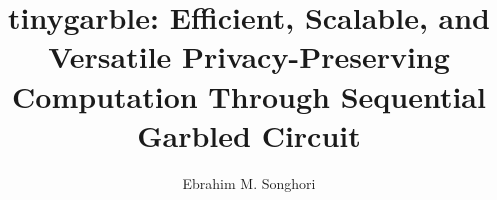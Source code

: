 \documentclass[12pt]{ruthesis}
\title{\gls{tinygarble}: Efficient, Scalable, and Versatile Privacy-Preserving Computation Through Sequential Garbled Circuit}
\author{Ebrahim M. Songhori}
\begin{document}
  \begin{frontmatter}
   \maketitle
   
   \tableofcontents
   \listoffigures
   \listoftables
  \end{frontmatter}











\appendices





\pagebreak
\printglossary



\end{document}
